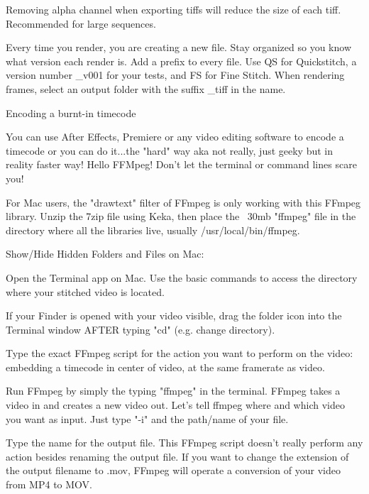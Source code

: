 \begin{fullwidth}

\tip Removing alpha channel when exporting tiffs will reduce the size of each tiff. Recommended for large sequences.

Every time you render, you are creating a new file. Stay organized so you know what version each render is. Add a prefix to every file. Use QS for Quickstitch, a version number \_v001 for your tests, and FS for Fine Stitch. When rendering frames, select an output folder with the suffix  \_tiff in the name.

\clearpage
{\large Encoding a burnt-in timecode \par}


You can use After Effects, Premiere or any video editing software to encode a timecode or you can do it...the "hard" way aka not really, just geeky but in reality faster way! Hello FFMpeg! Don't let the terminal or command lines scare you!

For Mac users, the "drawtext" filter of FFmpeg is only working with this FFmpeg library. Unzip the 7zip file using Keka, then place the ~30mb "ffmpeg" file in the directory where all the libraries live, usually /usr/local/bin/ffmpeg.

Show/Hide Hidden Folders and Files on Mac:

 \par
{}

Open the Terminal app on Mac. Use the basic commands to access the directory where your stitched video is located.

\tip If your Finder is opened with your video visible, drag the folder icon into the Terminal window AFTER typing "cd" (e.g. change directory).

Type the exact FFmpeg script for the action you want to perform on the video: embedding a timecode in center of video, at the same framerate as video.


Run FFmpeg by simply the typing "ffmpeg" in the terminal. FFmpeg takes a video in and creates a new video out. Let's tell ffmpeg where and which video you want as input. Just type "-i" and the path/name of your file.


Type the name for the output file. This FFmpeg script doesn't really perform any action besides renaming the output file. If you want to change the extension of the output filename to .mov, FFmpeg will operate a conversion of your video from MP4 to MOV.


\end{fullwidth}
